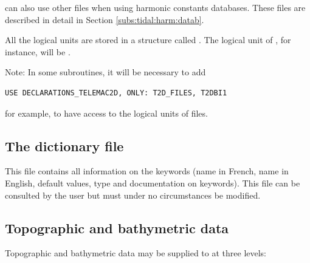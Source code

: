  can also use other files when using harmonic constants databases.
These files are described in detail in Section \ref{subs:tidal:harm:datab}.





All the logical units are stored in a structure called .
The logical unit of , for instance,
will be .

\begin{WarningBlock}{Note:}
 In some subroutines, it will be necessary to add
\begin{lstlisting}[language=TelFortran]
  USE DECLARATIONS_TELEMAC2D, ONLY: T2D_FILES, T2DBI1
\end{lstlisting}
 for example, to have access to the logical units of files.
\end{WarningBlock}

\subsection{The dictionary file}
\label{subs:dico:file}

This file contains all information on the keywords (name in French,
name in English, default values, type and documentation on keywords).
This file can be consulted by the user but must under no circumstances be
modified.


\subsection{Topographic and bathymetric data}
\label{subs:topo:bathy:data}
Topographic and bathymetric data may be supplied to  at three
levels:

